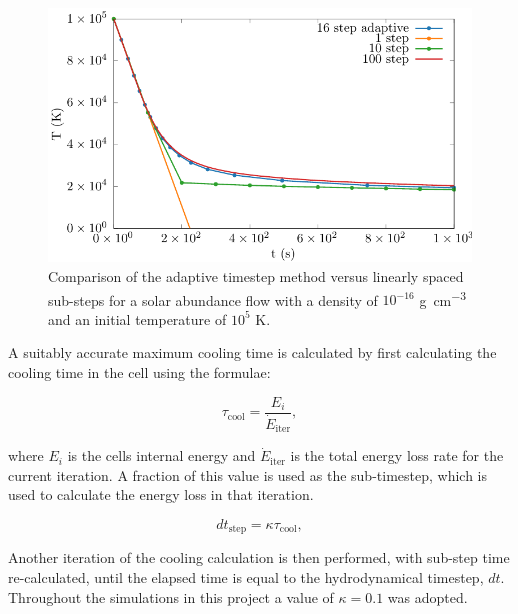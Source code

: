 \begin{figure}
  \centering
  \includegraphics{assets/plasma-cooling-benchmarks/evolution.pdf}
  \caption[Cooling sub-step method evolution comparison]{Comparison of the adaptive timestep method versus linearly spaced sub-steps for a solar abundance flow with a density of $10^{-16}$ \si{\gram\per\centi\metre\cubed} and an initial temperature of $10^5$ \si{\kelvin}.}
  \label{fig:cooling-loop-evolution}
\end{figure}

A suitably accurate maximum cooling time is calculated by first calculating the cooling time in the cell using the formulae:

\begin{equation}
  \tau_\text{cool} = \frac{E_i}{\dot{E}_\text{iter}},
\end{equation}

\noindent
where $E_i$ is the cells internal energy and $\dot{E}_\text{iter}$ is the total energy loss rate for the current iteration.
A fraction of this value is used as the sub-timestep, which is used to calculate the energy loss in that iteration.

\begin{equation}
  dt_\text{step} = \kappa \tau_\text{cool}, \label{eq:kappafirstuse}
\end{equation}

\noindent
Another iteration of the cooling calculation is then performed, with sub-step time re-calculated, until the elapsed time is equal to the hydrodynamical timestep, $dt$. Throughout the simulations in this project a value of $\kappa = 0.1$ was adopted.

